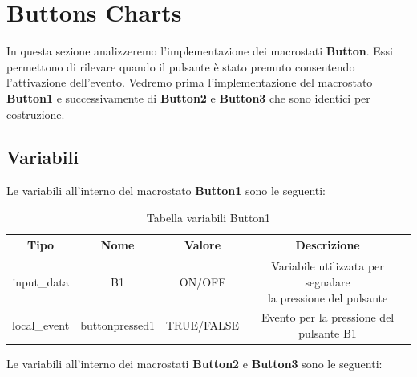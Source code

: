     \section{Buttons Charts}
        In questa sezione analizzeremo l'implementazione dei macrostati \textbf{Button}. Essi permettono di rilevare quando il pulsante è stato premuto consentendo l'attivazione dell'evento. 
        Vedremo prima l'implementazione del macrostato \textbf{Button1} e successivamente di \textbf{Button2} e \textbf{Button3} che sono identici per costruzione.

        \subsection{Variabili}
        Le variabili all'interno del macrostato \textbf{Button1} sono le seguenti:

            \begin{table}[H]
                \centering
                    \begin{tabular}{ | c | c | c | c |} 
                        \hline
                        \textbf{Tipo} & \textbf{Nome} & \textbf{Valore} & \textbf{Descrizione} \\ 
                        
                        \hline
                        input\_data & B1 & ON/OFF & \makecell{Variabile utilizzata per segnalare \\ la pressione del pulsante} \\ 
                        
                        \hline
                        local\_event & buttonpressed1 & TRUE/FALSE & Evento per la pressione del pulsante B1 \\ 
                        
                        \hline
                    \end{tabular}
                \caption{Tabella variabili Button1}
            \end{table}
            
            Le variabili all'interno dei macrostati \textbf{Button2} e \textbf{Button3} sono le seguenti:

